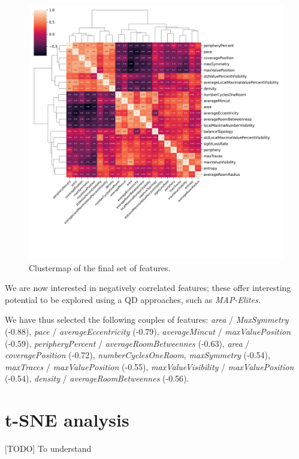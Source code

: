 \documentclass{Configuration_Files/PoliMi3i_thesis}
\begin{document}
\begin{figure}[hbt!]
    \centering
    \includegraphics[width=1.0\textwidth]{images/covariance_clustermap_final.png}
    \caption{Clustermap of the final set of features.}
    \label{fig:correlation_clustermap_final}
\end{figure}

We are now interested in negatively correlated features; these offer interesting potential to be explored using a QD approaches, such as \textit{MAP-Elites}. 

We have thus selected the following couples of features: \textit{area} / \textit{MaxSymmetry} (-0.88), \textit{pace} / \textit{averageEccentricity} (-0.79), \textit{averageMincut} / \textit{maxValuePosition} (-0.59), \textit{peripheryPercent} / \textit{averageRoomBetweennes} (-0.63), \textit{area} / \textit{coveragePosition} (-0.72), \textit{numberCyclesOneRoom}, \textit{maxSymmetry} (-0.54), \textit{maxTraces} / \textit{maxValuePosition} (-0.55), \textit{maxValueVisibility} / \textit{maxValuePosition} (-0.54), \textit{density} / \textit{averageRoomBetweennes} (-0.56).

\section{t-SNE analysis}
[TODO] To understand 
\end{document}
